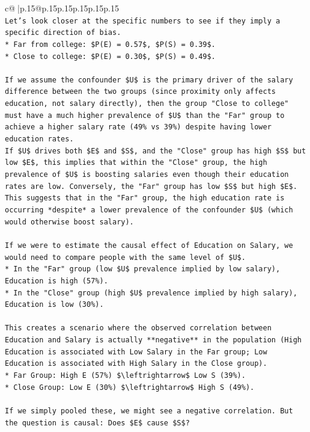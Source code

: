 \documentclass{article}
\begin{document}
{\begin{supertabular}{c@{$\;$}|p{.15\linewidth}@{}p{.15\linewidth}p{.15\linewidth}p{.15\linewidth}p{.15\linewidth}p{.15\linewidth}}
{{{\\ 
\texttt{Let's look closer at the specific numbers to see if they imply a specific direction of bias.} \\
\texttt{*   Far from college: \$P(E) = 0.57\$, \$P(S) = 0.39\$.} \\
\texttt{*   Close to college: \$P(E) = 0.30\$, \$P(S) = 0.49\$.} \\
\\ 
\texttt{If we assume the confounder \$U\$ is the primary driver of the salary difference between the two groups (since proximity only affects education, not salary directly), then the group "Close to college" must have a much higher prevalence of \$U\$ than the "Far" group to achieve a higher salary rate (49\% vs 39\%) despite having lower education rates.} \\
\texttt{If \$U\$ drives both \$E\$ and \$S\$, and the "Close" group has high \$S\$ but low \$E\$, this implies that within the "Close" group, the high prevalence of \$U\$ is boosting salaries even though their education rates are low. Conversely, the "Far" group has low \$S\$ but high \$E\$. This suggests that in the "Far" group, the high education rate is occurring *despite* a lower prevalence of the confounder \$U\$ (which would otherwise boost salary).} \\
\\ 
\texttt{If we were to estimate the causal effect of Education on Salary, we would need to compare people with the same level of \$U\$.} \\
\texttt{*   In the "Far" group (low \$U\$ prevalence implied by low salary), Education is high (57\%).} \\
\texttt{*   In the "Close" group (high \$U\$ prevalence implied by high salary), Education is low (30\%).} \\
\\ 
\texttt{This creates a scenario where the observed correlation between Education and Salary is actually **negative** in the population (High Education is associated with Low Salary in the Far group; Low Education is associated with High Salary in the Close group).} \\
\texttt{*   Far Group: High E (57\%) \$\textbackslash{}leftrightarrow\$ Low S (39\%).} \\
\texttt{*   Close Group: Low E (30\%) \$\textbackslash{}leftrightarrow\$ High S (49\%).} \\
\\ 
\texttt{If we simply pooled these, we might see a negative correlation. But the question is causal: Does \$E\$ cause \$S\$?} \\
}}}
\end{supertabular}}
\end{document}
